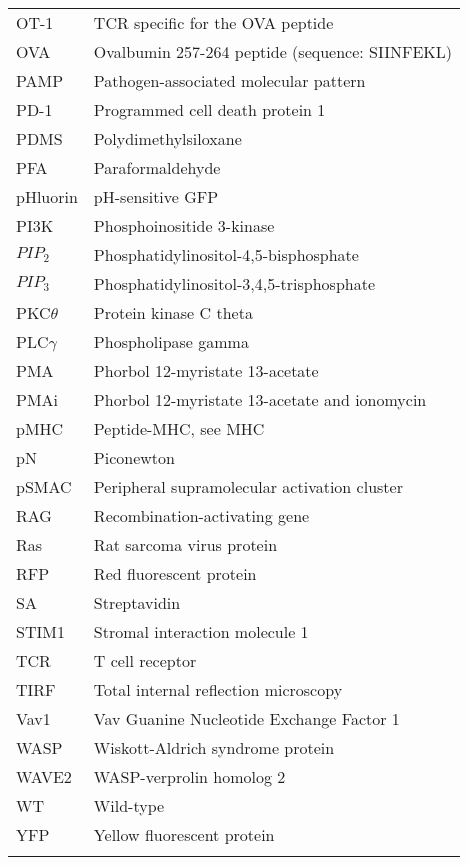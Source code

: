 \documentclass[phd,tocprelim]{cornell}
\begin{document}
\begin{longtable}{ p{} p{} }
	OT-1 & TCR specific for the OVA peptide \\
	OVA & Ovalbumin 257-264 peptide (sequence: SIINFEKL) \\
	PAMP & Pathogen-associated molecular pattern \\
	PD-1 & Programmed cell death protein 1 \\
	PDMS & Polydimethylsiloxane \\
	PFA & Paraformaldehyde \\
	pHluorin & pH-sensitive GFP \\
	PI3K & Phosphoinositide 3-kinase \\
	$PIP_2$ & Phosphatidylinositol-4,5-bisphosphate \\
	$PIP_3$ & Phosphatidylinositol-3,4,5-trisphosphate \\
	PKC$\theta$ & Protein kinase C theta \\
	PLC$\gamma$ & Phospholipase gamma \\
	PMA & Phorbol 12-myristate 13-acetate \\
	PMAi & Phorbol 12-myristate 13-acetate and ionomycin \\
	pMHC & Peptide-MHC, see MHC \\
	pN & Piconewton \\
	pSMAC & Peripheral supramolecular activation cluster \\
	RAG & Recombination-activating gene \\
	Ras & Rat sarcoma virus protein \\
	RFP & Red fluorescent protein \\
	SA & Streptavidin \\
	STIM1 & Stromal interaction molecule 1 \\
	TCR & T cell receptor \\
	TIRF & Total internal reflection microscopy \\
	Vav1 & Vav Guanine Nucleotide Exchange Factor 1 \\
	WASP & Wiskott-Aldrich syndrome protein \\
	WAVE2 & WASP-verprolin homolog 2 \\
	WT & Wild-type \\
	YFP & Yellow fluorescent protein \\
	\label{tab:abbreviations}
\end{longtable}
%

\normalspacing \setcounter{page}{1} 
\pagestyle{cornell} \addtolength{\parskip}{0.5\baselineskip}
\end{document}
